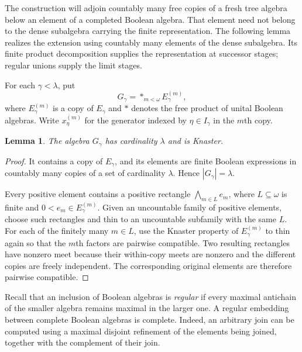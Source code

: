 \documentclass[11pt]{article}
\newtheorem{lemma}[theorem]{Lemma}
\theoremstyle{definition}
\theoremstyle{remark}
\begin{document}
The construction will adjoin countably many free copies of a fresh tree
algebra below an element of a completed Boolean algebra.  That element
need not belong to the dense
subalgebra carrying the finite representation.  The following lemma realizes
the extension using countably many elements of the dense subalgebra.  Its
finite product decomposition supplies the representation at successor stages;
regular unions supply the limit stages.

For each $\gamma<\lambda$, put
\[
 G_\gamma=*_{m<\omega}E_\gamma^{(m)},
\]
where $E_\gamma^{(m)}$ is a copy of $E_\gamma$ and $*$ denotes the free
product of unital Boolean algebras.  Write $x_\eta^{(m)}$ for the generator
indexed by $\eta\in I_\gamma$ in the $m$th copy.

\begin{lemma}\label{lem:countable-free-product}
The algebra $G_\gamma$ has cardinality $\lambda$ and is Knaster.
\end{lemma}

\begin{proof}
It contains a copy of $E_\gamma$, and its elements are finite Boolean
expressions in countably many copies of a set of cardinality $\lambda$.
Hence $|G_\gamma|=\lambda$.

Every positive element contains a positive rectangle
$\bigwedge_{m\in L}e_m$, where $L\subseteq\omega$ is finite and
$0<e_m\in E_\gamma^{(m)}$.  Given an uncountable family of positive
elements, choose such rectangles and thin to an uncountable subfamily
with the same $L$.  For each of the finitely many $m\in L$, use the
Knaster property of $E_\gamma^{(m)}$ to thin again so that the $m$th
factors are pairwise compatible.  Two resulting rectangles have nonzero
meet because their within-copy meets are nonzero and the different
copies are freely independent.  The corresponding original elements
are therefore pairwise compatible.
\end{proof}

Recall that an inclusion of Boolean algebras is \emph{regular} if every
maximal antichain of the smaller algebra remains maximal in the larger one.
A regular embedding between complete Boolean algebras is complete.  Indeed,
an arbitrary join can be computed using a maximal disjoint refinement of the
elements being joined, together with the complement of their join.
\end{document}
